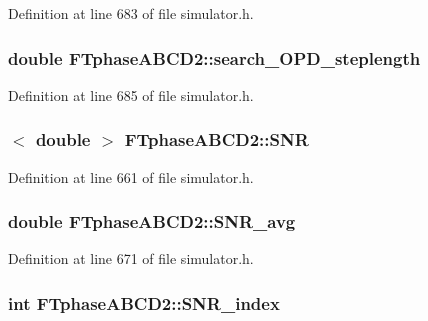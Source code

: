 Definition at line 683 of file simulator.h.

\hypertarget{classFTphaseABCD2_a46306d45679d576f25e41615c2f245cf}{
\subsubsection[{search\_\-OPD\_\-steplength}]{\setlength{\rightskip}{0pt plus 5cm}double {\bf FTphaseABCD2::search\_\-OPD\_\-steplength}}}
\label{classFTphaseABCD2_a46306d45679d576f25e41615c2f245cf}


Definition at line 685 of file simulator.h.

\hypertarget{classFTphaseABCD2_a664467cd85ae3f6dd45ec64e52430bef}{
\subsubsection[{SNR}]{$<$ double $>$ {\bf FTphaseABCD2::SNR}}}
\label{classFTphaseABCD2_a664467cd85ae3f6dd45ec64e52430bef}


Definition at line 661 of file simulator.h.

\hypertarget{classFTphaseABCD2_a6d0103d73ed84a569b176cf2520d94f6}{
\subsubsection[{SNR\_\-avg}]{\setlength{\rightskip}{0pt plus 5cm}double {\bf FTphaseABCD2::SNR\_\-avg}}}
\label{classFTphaseABCD2_a6d0103d73ed84a569b176cf2520d94f6}


Definition at line 671 of file simulator.h.

\hypertarget{classFTphaseABCD2_a480872d80dbf7d66af1b6f1757a0834e}{
\subsubsection[{SNR\_\-index}]{\setlength{\rightskip}{0pt plus 5cm}int {\bf FTphaseABCD2::SNR\_\-index}}}
\label{classFTphaseABCD2_a480872d80dbf7d66af1b6f1757a0834e}


